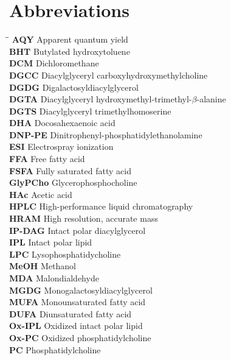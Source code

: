 \section{Abbreviations}
\begin{tabbing}
\hspace*{3cm}\=\hspace*{3cm}\= \kill
\textbf{AQY}\> Apparent quantum yield\\
\textbf{BHT}\> Butylated hydroxytoluene\\
\textbf{DCM}\> Dichloromethane\\
\textbf{DGCC}\> Diacylglyceryl carboxyhydroxymethylcholine\\
\textbf{DGDG}\> Digalactosyldiacylglycerol\\
\textbf{DGTA}\> Diacylglyceryl hydroxymethyl-trimethyl-$\beta$-alanine\\
\textbf{DGTS}\> Diacylglyceryl trimethylhomoserine\\
\textbf{DHA}\> Docosahexaenoic acid\\
\textbf{DNP-PE}\> Dinitrophenyl-phosphatidylethanolamine\\
\textbf{ESI}\> Electrospray ionization\\
\textbf{FFA}\> Free fatty acid\\
\textbf{FSFA}\> Fully saturated fatty acid\\
\textbf{GlyPCho}\> Glycerophosphocholine\\
\textbf{HAc}\> Acetic acid\\
\textbf{HPLC}\> High-performance liquid chromatography\\
\textbf{HRAM}\> High resolution, accurate mass\\
\textbf{IP-DAG}\> Intact polar diacylglycerol\\
\textbf{IPL}\> Intact polar lipid\\
\textbf{LPC}\> Lysophosphatidycholine\\
\textbf{MeOH}\> Methanol\\
\textbf{MDA}\> Malondialdehyde\\
\textbf{MGDG}\> Monogalactosyldiacylglycerol\\
\textbf{MUFA}\> Monounsaturated fatty acid\\
\textbf{DUFA}\> Diunsaturated fatty acid\\
\textbf{Ox-IPL}\> Oxidized intact polar lipid\\
\textbf{Ox-PC}\> Oxidized phosphatidylcholine\\
\textbf{PC}\> Phosphatidylcholine\\

\end{tabbing}
